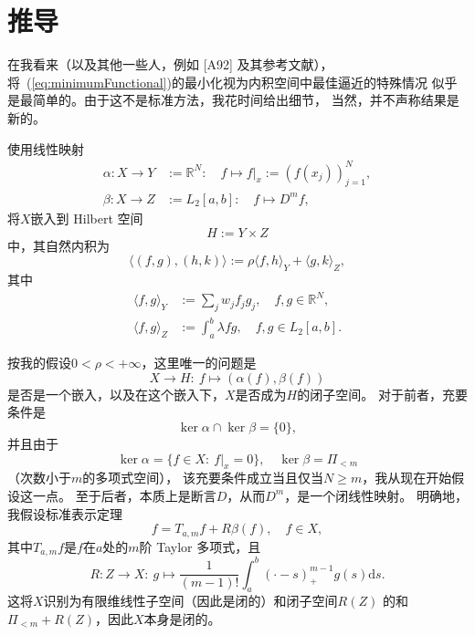 \section{推导}
在我看来（以及其他一些人，例如 [A92] 及其参考文献），
将~(\ref{eq:minimumFunctional})的最小化视为内积空间中最佳逼近的特殊情况
似乎是最简单的。由于这不是标准方法，我花时间给出细节，
当然，并不声称结果是新的。

使用线性映射
\begin{align*}
  \alpha:X\to Y&:=\mathbb{R}^{N}:\quad
                 f\mapsto f|_{x}:= \left( f(x_{j})  \right)_{j=1}^{N},\\
  \beta:X\to Z&:=L_{2}[a,b]:\quad
                f\mapsto D^{m}f,
\end{align*}
将$X$嵌入到 Hilbert 空间
\begin{displaymath}
  H:=Y\times Z
\end{displaymath}
中，其自然内积为
\begin{displaymath}
  \langle (f,g),(h,k)\rangle
  :=\rho\langle f,h\rangle_{Y}+\langle g,k\rangle_{Z},
\end{displaymath}
其中
\begin{align*}
  \langle f,g\rangle_{Y}&:=\sum_{j}w_{j}f_{j}g_{j},
                          \quad f,g\in \mathbb{R}^{N},\\
  \langle f,g\rangle_{Z}&:=\int_{a}^{b}\lambda fg,
                          \quad f,g\in L_{2}[a,b].
\end{align*}

按我的假设$0<\rho<+\infty$，这里唯一的问题是
\begin{displaymath}
  X\to H:\ f\mapsto \left(\alpha(f),\beta(f)\right)
\end{displaymath}
是否是一个嵌入，以及在这个嵌入下，$X$是否成为$H$的闭子空间。
对于前者，充要条件是
\begin{displaymath}
  \ker\alpha \cap \ker \beta=\{0\},
\end{displaymath}
并且由于
\begin{displaymath}
  \ker\alpha =\{f\in X:\ f|_{x}=0\},\quad
  \ker \beta=\Pi_{<m}
\end{displaymath}
（次数小于$m$的多项式空间），
该充要条件成立当且仅当$N\ge m$，我从现在开始假设这一点。
至于后者，本质上是断言$D$，从而$D^{m}$，是一个闭线性映射。
明确地，我假设标准表示定理
\begin{equation}
  \label{eq:standardRepresentationX}
  f=T_{a,m}f+R\beta(f),\quad f\in X,
\end{equation}
其中$T_{a,m}f$是$f$在$a$处的$m$阶 Taylor 多项式，且
\begin{displaymath}
  R:Z\to X:\
  g\mapsto \frac{1}{(m-1)!}
  \int_{a}^{b}(\cdot -s)^{m-1}_{+}g(s)\mathrm{d}s.
\end{displaymath}
这将$X$识别为有限维线性子空间（因此是闭的）和闭子空间$R(Z)$
的和 $\Pi_{<m}+R(Z)$，因此$X$本身是闭的。

